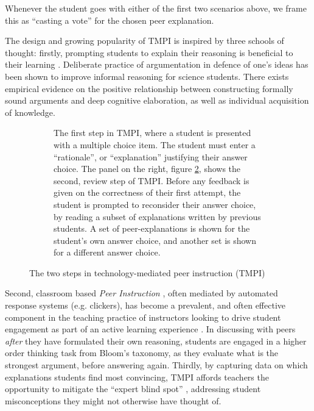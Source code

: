 \documentclass[notitlepage,12pt]{jedm}
\begin{document}
Whenever the student goes with either of the first two scenarios above, we 
frame this as ``casting a vote'' for the chosen peer explanation.

The design and growing popularity of TMPI is inspired by three schools of 
thought: firstly, prompting students to explain their reasoning is beneficial 
to their learning \cite{chi_eliciting_1994}. 
Deliberate practice of argumentation in defence of one's ideas has been shown 
to improve informal reasoning for science students\cite{venville_impact_2010}.
There exists empirical evidence on the positive relationship between 
constructing formally sound arguments and deep cognitive elaboration, as well 
as individual acquisition of knowledge\cite{stegmann_collaborative_2012}.


\begin{figure}[H]
	\begin{subfigure}[b]{0.4\textwidth}
		\def\svgscale{0.50}
		
		\caption{
			The first step in TMPI, where a student is presented with a 
			multiple choice item. The student must enter a ``rationale'', or 
			``explanation'' justifying their answer choice.
			\newline
			\newline
			The panel on the right, figure \protect\ref{fig:question_review}, 
			shows the second, review step of TMPI.
			Before any feedback is given on the correctness of their first 
			attempt, the student is prompted to reconsider their answer choice, 
			by reading a subset of explanations written by previous students.
			A set of peer-explanations is shown for the student's own answer 
			choice, and another set is shown for a different answer choice. 
		}
		\label{fig:question_start}
	\end{subfigure}
	\qquad
	\begin{subfigure}[b]{0.6\textwidth}
		\def\svgscale{0.50}
		
		\caption{}
		\label{fig:question_review}
	\end{subfigure}
	\caption{The two steps in technology-mediated peer 
		instruction (TMPI)}
	\label{fig:tmpi}
\end{figure}


Second, classroom based \textit{Peer Instruction} \cite{crouch_peer_2001}, 
often mediated by automated response systems (e.g. clickers), has become a 
prevalent, and often effective component in the teaching practice of 
instructors looking to drive student engagement as part of an active learning 
experience \cite{charles_beyond_2015}. 
In discussing with peers \textit{after} they have formulated their own 
reasoning, students are engaged in a higher order thinking task from Bloom's 
taxonomy, as they evaluate what is the strongest argument, before answering 
again.
Thirdly, by capturing data on which explanations students find most convincing, 
TMPI affords teachers the opportunity to mitigate the ``expert blind spot'' 
\cite{nathan_expert_2001}, addressing student misconceptions they might not 
otherwise have thought of.
\end{document}
